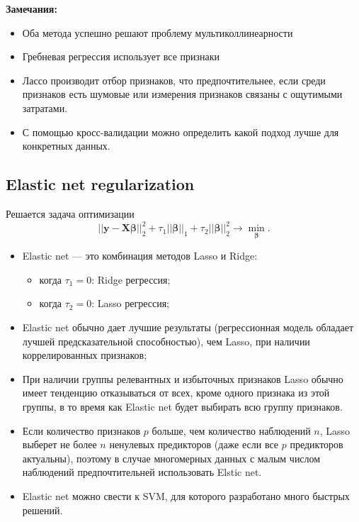 \documentclass[12pt,a4paper,final]{article}
\newcommand{\1}{\mathds{1}}
\begin{document}
\textbf{Замечания:}
\begin{itemize}
	\item Оба метода успешно решают проблему мультиколлинеарности
\item Гребневая регрессия использует все признаки
\item Лассо производит отбор признаков, что предпочтительнее, если среди признаков есть шумовые или измерения признаков связаны с ощутимыми затратами.
\item С помощью кросс-валидации можно определить какой подход лучше для конкретных данных.
\end{itemize}

\subsection{Elastic net regularization}
Решается задача оптимизации
\begin{equation*}
	||\bm y -\bm{X} \bm \beta||_{2}^{2} + \tau_{1}||\bm \beta ||_{1}+\tau_{2}||\bm \beta||_{2}^{2}
	\rightarrow\min_{\bm \beta}.
\end{equation*}
\begin{itemize}
	\item Elastic net --- это комбинация методов Lasso и Ridge:
	\begin{itemize}
		\item когда $\tau_1 = 0$: Ridge регрессия;
		\item когда $\tau_2 = 0$: Lasso регрессия;
	\end{itemize}
	\item Elastic net обычно дает лучшие результаты (регрессионная модель обладает лучшей предсказательной способностью), чем Lasso, при наличии коррелированных признаков;
	\item При наличии группы релевантных и избыточных признаков Lasso обычно имеет тенденцию отказываться от всех, кроме одного признака из этой группы, в то время как Elastic net будет выбирать всю группу признаков.
	\item  Если количество признаков $p$ больше, чем количество наблюдений $n$, Lasso выберет не более $n$ ненулевых предикторов (даже если все $p$ предикторов актуальны), поэтому в случае многомерных данных с малым числом наблюдений предпочтительней использовать Elstic net.
	\item Elastic net можно свести к SVM, для которого разработано много быстрых решений.
	
\end{itemize}
\end{document}
